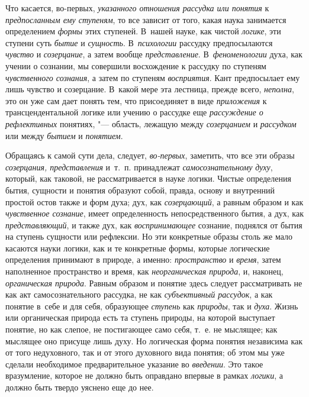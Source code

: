 Что касается, во-первых, {\em указанного отношения рассудка или понятия}
к {\em предпосланным ему ступеням}, то все зависит от того, какая наука
занимается определением {\em формы} этих ступеней. В~нашей науке, как
чистой {\em логике}, эти ступени суть {\em бытие} и {\em сущность}.
В~{\em психологии} рассудку предпосылаются {\em чувство} и
{\em созерцание}, а затем вообще {\em представление}. В~{\em феноменологии}
духа, как учении о сознании, мы совершили восхождение к рассудку по
ступеням {\em чувственного сознания}, а затем по ступеням
{\em восприятия}. Кант предпосылает ему лишь чувство и созерцание. В~какой
мере эта лестница, прежде всего, {\em неполна}, это он уже сам дает
понять тем, что присоединяет в виде {\em приложения} к трансцендентальной
логике или учению о рассудке еще {\em рассуждение о рефлективных}
понятиях, "--- область, лежащую между {\em созерцанием} и {\em рассудком}
или между {\em бытием} и {\em понятием}.

Обращаясь к самой сути дела, следует, {\em во-первых},
заметить, что все эти образы {\em созерцания, представления}
и~т.~п. принадлежат {\em самосознательному духу},
который, как таковой, не рассматривается в науке логики.
Чистые определения бытия, сущности и понятия образуют собой, правда, основу
и внутренний простой остов также и форм духа; дух, как
{\em созерцающий}, а равным образом и как {\em чувственное сознание},
имеет определенность непосредственного бытия, а дух, как {\em представляющий},
и также дух, как {\em воспринимающее}
сознание, поднялся от бытия на ступень сущности или
рефлексии. Но эти конкретные образы столь же мало касаются науки логики,
как и те конкретные формы, которые логические определения принимают в
природе, а именно: {\em пространство} и {\em время},
затем наполненное пространство и время, как
{\em неорганическая природа}, и, наконец, {\em органическая природа}.
Равным образом и понятие здесь следует рассматривать не как
акт самосознательного рассудка, не как {\em субъективный рассудок},
а как понятие в~себе и для себя, образующее {\em ступень} как
{\em природы}, так и {\em духа}. Жизнь или
органическая природа есть та ступень природы, на которой выступает понятие,
но как слепое, не постигающее само себя, т.~е. не мыслящее; как мыслящее
оно присуще лишь духу. Но логическая форма понятия независима как от того
недуховного, так и от этого духовного вида понятия; об этом мы уже сделали
необходимое предварительное указание во {\em введении}. Это такое
вразумление, которое не должно быть оправдано впервые в рамках
{\em логики}, а должно быть твердо уяснено еще до нее.

